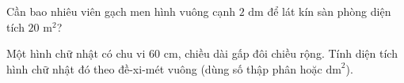 \begin{ex} %
Cần bao nhiêu viên gạch men hình vuông cạnh $2\text{ dm}$ để lát kín sàn phòng diện tích $20\text{ m}^2$?
\end{ex}

\begin{ex} %
Một hình chữ nhật có chu vi $60\text{ cm}$, chiều dài gấp đôi chiều rộng. Tính diện tích hình chữ nhật đó theo đề-xi-mét vuông (dùng số thập phân hoặc $\text{dm}^2$).
\end{ex}
